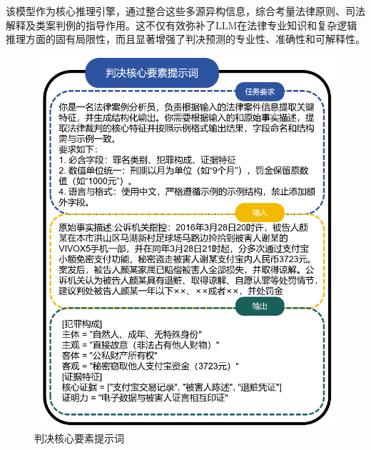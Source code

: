 该模型作为核心推理引擎，通过整合这些多源异构信息，综合考量法律原则、司法解释及类案判例的指导作用。这不仅有效弥补了LLM在法律专业知识和复杂逻辑推理方面的固有局限性，而且显著增强了判决预测的专业性、准确性和可解释性。
\begin{figure}[!htbp]
	\begin{minipage}{0.5\linewidth}
			\centering
	\includegraphics[width=1\linewidth]{fig/prompt1.pdf}
	\caption{判决核心要素提示词}
	\label{fig:prompt1}
	\end{minipage}
	\begin{minipage}{0.5\linewidth}
		\centering

\end{minipage}
\end{figure}
